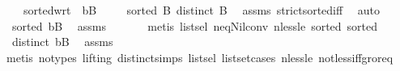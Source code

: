 \begin{isabellebody}
\ \ \ \ {\isachardoublequoteopen}sorted{\isacharunderscore}{\kern0pt}wrt\ {\isacharparenleft}{\kern0pt}{\isacharless}{\kern0pt}{\isacharparenright}{\kern0pt}\ {\isacharparenleft}{\kern0pt}b{\isacharhash}{\kern0pt}B{\isacharparenright}{\kern0pt}{\isachardoublequoteclose}\isanewline
%
\isadelimproof
%
\endisadelimproof
%
\isatagproof
{}\isamarkupfalse%
{\isacharminus}{\kern0pt}\isanewline
\ \ \isamarkupfalse%
\ {}{\isacharcolon}{\kern0pt}\ {\isachardoublequoteopen}sorted\ B{\isachardoublequoteclose}\ {\isachardoublequoteopen}distinct\ B{\isachardoublequoteclose}\ \isamarkupfalse%
\ assms\ strict{\isacharunderscore}{\kern0pt}sorted{\isacharunderscore}{\kern0pt}iff\ \isamarkupfalse%
\ auto\isanewline
\ \ \isamarkupfalse%
\ {}{\isacharcolon}{\kern0pt}\ {\isachardoublequoteopen}sorted\ {\isacharparenleft}{\kern0pt}b{\isacharhash}{\kern0pt}B{\isacharparenright}{\kern0pt}{\isachardoublequoteclose}\ \isamarkupfalse%
\ assms{\isacharparenleft}{\kern0pt}{}{\isacharparenright}{\kern0pt}\ {}{\isacharparenleft}{\kern0pt}{}{\isacharparenright}{\kern0pt}\isanewline
\ \ \ \ \isamarkupfalse%
\ {\isacharparenleft}{\kern0pt}metis\ list{\isachardot}{\kern0pt}sel{\isacharparenleft}{\kern0pt}{}{\isacharparenright}{\kern0pt}\ neq{\isacharunderscore}{\kern0pt}Nil{\isacharunderscore}{\kern0pt}conv\ nless{\isacharunderscore}{\kern0pt}le\ sorted{}\ sorted{}{\isacharparenright}{\kern0pt}\isanewline
\ \ \isamarkupfalse%
\ {}{\isacharcolon}{\kern0pt}\ {\isachardoublequoteopen}distinct\ {\isacharparenleft}{\kern0pt}b{\isacharhash}{\kern0pt}B{\isacharparenright}{\kern0pt}{\isachardoublequoteclose}\ \isamarkupfalse%
\ assms{\isacharparenleft}{\kern0pt}{}{\isacharparenright}{\kern0pt}\ {}\ {}\isanewline
\ \ \ \ \isamarkupfalse%
\ {\isacharparenleft}{\kern0pt}metis\ {\isacharparenleft}{\kern0pt}no{\isacharunderscore}{\kern0pt}types{\isacharcomma}{\kern0pt}\ lifting{\isacharparenright}{\kern0pt}\ distinct{\isachardot}{\kern0pt}simps{\isacharparenleft}{\kern0pt}{}{\isacharparenright}{\kern0pt}\ list{\isachardot}{\kern0pt}sel{\isacharparenleft}{\kern0pt}{}{\isacharparenright}{\kern0pt}\ list{\isachardot}{\kern0pt}set{\isacharunderscore}{\kern0pt}cases\ nless{\isacharunderscore}{\kern0pt}le\ not{\isacharunderscore}{\kern0pt}less{\isacharunderscore}{\kern0pt}iff{\isacharunderscore}{\kern0pt}gr{\isacharunderscore}{\kern0pt}or{\isacharunderscore}{\kern0pt}eq\isanewline

\end{isabellebody}
